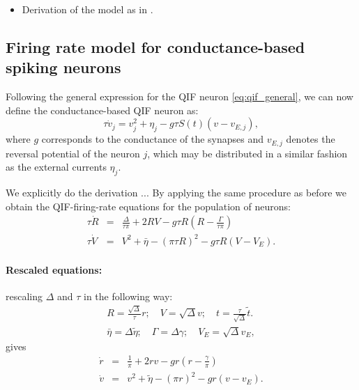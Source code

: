 \begin{itemize}
\item Derivation of the model as in \cite{Montbrio2015}.
\end{itemize}

\subsection{Firing rate model for conductance-based spiking neurons}

Following the general expression  for the QIF neuron
\eqref{eq:qif_general}, we can now define the conductance-based QIF
neuron as:
\begin{equation}
\label{eq:1}
\tau \dot{v}_j = v_j^2 + \eta_j - g \tau S \left( t \right) \left(
  v - v_{E,j} \right),
\end{equation}
where $g$ corresponds to the conductance of the synapses and
$v_{E,j}$ denotes the reversal potential of the neuron $j$, which may
be distributed in a similar fashion as the external currents $\eta_j$.

{\color{red} We explicitly do the derivation ... }
By applying the same procedure as before we obtain the QIF-firing-rate
equations for the population of neurons:
\begin{subequations}
  \label{eq:conductance_fr}
\begin{eqnarray}
\label{eq:conductance_fr-R}
\tau \dot R & = & \frac{\Delta}{\tau \pi} + 2 R V - g \tau R \left( R
                  - \frac{\Gamma }{\tau\pi}\right) \\
  \label{eq:conductance_fr-V}
\tau \dot V & = & V^2 + \bar{\eta} - \left( \pi \tau R \right)^2 - g
                  \tau R \left( V - V_E \right).
\end{eqnarray}
\end{subequations}

\paragraph{Rescaled equations:} rescaling $\Delta$ and $\tau$ in the
following way:
\begin{eqnarray}
\label{eq:3}
R = \frac{\sqrt{\Delta}}{\tau} r; \quad V = \sqrt{\Delta} v; \quad t =
\frac{\tau}{\sqrt{\Delta}}\tilde{t}. \\
\bar{\eta} = \Delta \tilde{\eta}; \quad \Gamma = \Delta \gamma; \quad
V_E = \sqrt{\Delta} v_E, \nonumber
\end{eqnarray}
gives
\begin{subequations}
\label{eq:conductance_fr-rescaled}
\begin{eqnarray}
\label{eq:conductance_fr-R-r}
\dot r & = & \frac{1}{\pi} + 2 rv - g r \left( r
                  - \frac{\gamma}{\pi}\right) \\
  \label{eq:conductance_fr-V-r}
\dot v & = & v^2 + \tilde{\eta} - \left( \pi  r \right)^2 - g
                  r \left( v - v_E \right).
\end{eqnarray}
\end{subequations}





